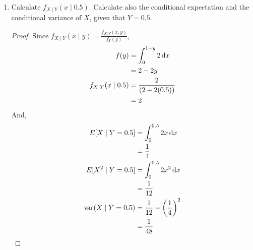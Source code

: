 \documentclass[paper=usletter, fontsize=12pt]{article}
\begin{document}
\begin{enumerate}
\begin{enumerate}
\begin{proof}
                Since $P(B \mid A) = \frac{P(A \cap B)}{P(A)}$,
                \begin{align*}
                    P(A \cap B) & = \int_{0}^{0.5}\int_{0}^{1-y}2\diff{x}\diff{y} \\
                    & = \frac{3}{4} \\
                    P(A) & = \int_{0}^{0.5}\int_{x}^{0.5}2\diff{y}\diff{x} \\
                    & = \frac{1}{4}
                \end{align*}
                \endgroup
                Therefore,
                \begin{align*}
                    P(B \mid A) & = \frac{1}{3} \qedhere
                \end{align*}

            \end{proof}

            \item Calculate $f_{X \mid Y}(x \mid 0.5)$. Calculate also the
            conditional expectation and the conditional variance of $X$, given
            that $Y=0.5$.
            \begin{proof}

                Since $f_{X \mid Y}(x \mid y) = \frac{f_{X,Y}(x,y)}{f_Y(y)}$,
                \begin{align*}
                    f(y) &= \int_{0}^{1-y}2\mathop{}\!\mathrm{d}{x}\\
                    & = 2-2y \\
                    f_{X \mid Y}(x \mid 0.5) & = \frac{2}{(2-2(0.5))} \\
                    & = 2
                \end{align*}
                \endgroup
                And,
                \begin{align*}
                    E[X \mid Y = 0.5] &= \int_{0}^{0.5}2x\mathop{}\!\mathrm{d}{x}\\
                    & = \frac{1}{4} \\
                    E[X^2 \mid Y = 0.5] &= \int_{0}^{0.5}2x^2\mathop{}\!\mathrm{d}{x}\\
                    & = \frac{1}{12} \\
                    \operatorname{var}(X \mid Y = 0.5) & = \frac{1}{12} - \bigg(\frac{1}{4}\bigg)^2\\
                    & = \frac{1}{48} \qedhere
                \end{align*}
                \endgroup


\end{proof}
\end{enumerate}
\end{enumerate}
\end{document}

